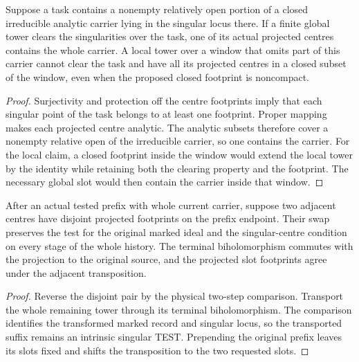 \begin{proposition}
\label{hir:g8-irreducible-serving-footprint}
\leanok
Suppose a task contains a nonempty relatively open portion of a
closed irreducible analytic carrier lying in the singular locus there.
If a finite global tower clears the singularities over the task, one
of its actual projected centres contains the whole carrier. A local
tower over a window that omits part of this carrier cannot clear the
task and have all its projected centres in a closed subset of the
window, even when the proposed closed footprint is noncompact.
\end{proposition}
\begin{proof}
Surjectivity and protection off the centre footprints imply that each
singular point of the task belongs to at least one footprint. Proper
mapping makes each projected centre analytic. The analytic subsets
therefore cover a nonempty relative open of the irreducible carrier,
so one contains the carrier. For the local claim, a closed footprint
inside the window would extend the local tower by the identity while
retaining both the clearing property and the footprint. The necessary
global slot would then contain the carrier inside that window.
\end{proof}

\begin{proposition}
\label{hir:g8-disjoint-swap-full-history}
\leanok
After an actual tested prefix with whole current carrier, suppose
two adjacent centres have disjoint projected footprints on the prefix
endpoint. Their swap preserves the test for the original marked ideal
and the singular-centre condition on every stage of the whole history.
The terminal biholomorphism commutes with the projection to the
original source, and the projected slot footprints agree under the
adjacent transposition.
\end{proposition}
\begin{proof}
Reverse the disjoint pair by the physical two-step comparison.
Transport the whole remaining tower through its terminal
biholomorphism. The comparison identifies the transformed marked
record and singular locus, so the transported suffix remains an
intrinsic singular TEST. Prepending the original prefix leaves its
slots fixed and shifts the transposition to the two requested slots.
\end{proof}


